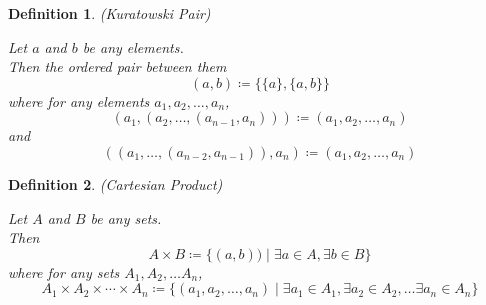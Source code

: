 \documentclass{article}
\newtheorem{defn}{Definition}[section]
\begin{document}
\medskip

\begin{defn} (Kuratowski Pair)
	\label{defn:pair}
	
	Let \(a\) and \(b\) be any elements. \\
	Then the ordered pair between them
	\begin{equation}
		(a, b) \coloneq \{\{a\}, \{a, b\}\}
	\end{equation}
	where for any elements \(a_{1}, a_{2}, \ldots, a_{n}\),
	\begin{equation}
		(a_{1}, (a_{2}, \ldots, (a_{n - 1}, a_{n}))) \coloneq (a_{1}, a_{2}, \ldots, a_{n})
	\end{equation}
	and 
	\begin{equation}
		((a_{1}, \ldots, (a_{n - 2}, a_{n - 1})), a_{n}) \coloneq (a_{1}, a_{2}, \ldots, a_{n})
	\end{equation}

\end{defn}

\medskip

\begin{defn} (Cartesian Product)
	\label{defn:cartesian_product}

	Let \(A\) and \(B\) be any sets. \\
	Then
	\begin{equation}
		A \times B \coloneq \{(a, b)) \mid \exists a \in A, \exists b \in B\}
	\end{equation}
	where for any sets \(A_{1}, A_{2}, \ldots A_{n}\),
	\begin{equation}
		A_{1} \times A_{2} \times \cdots \times A_{n} \coloneq\{(a_{1}, a_{2}, \ldots, a_{n}) \mid \exists a_{1} \in A_{1}, 
			\exists a_{2} \in A_{2}, \ldots \exists a_{n} \in A_{n}\} 
	\end{equation}
	
\end{defn}

\medskip
\end{document}
